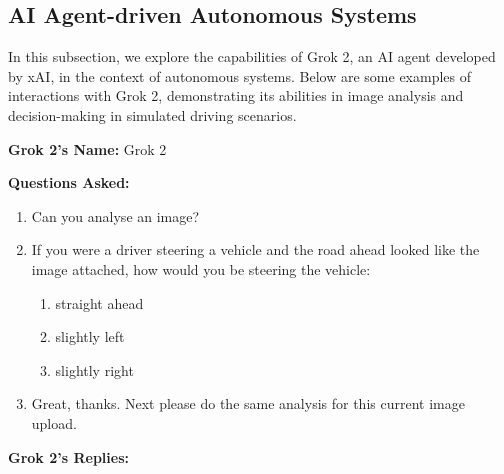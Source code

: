 






\subsection{AI Agent-driven Autonomous Systems}

In this subsection, we explore the capabilities of Grok 2, an AI agent developed by xAI, in the context of autonomous systems. Below are some examples of interactions with Grok 2, demonstrating its abilities in image analysis and decision-making in simulated driving scenarios.

\textbf{Grok 2's Name:} Grok 2

\textbf{Questions Asked:}

\begin{enumerate}
    \item Can you analyse an image?
    \item If you were a driver steering a vehicle and the road ahead looked like the image attached, how would you be steering the vehicle: 
    \begin{enumerate}
        \item straight ahead
        \item slightly left
        \item slightly right
    \end{enumerate}
    \item Great, thanks. Next please do the same analysis for this current image upload.
\end{enumerate}

\textbf{Grok 2's Replies:}

